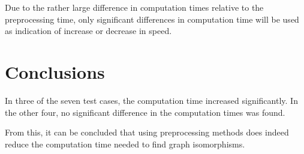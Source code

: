\documentclass[twoside]{article}
\theoremstyle{definition}
\theoremstyle{plain}
\begin{document}
\begin{multicols}{2}
Due to the rather large difference in computation times relative to the preprocessing time, only significant differences in computation time will be used as indication of increase or decrease in speed.

\section{Conclusions}

In three of the seven test cases, the computation time increased significantly. In the other four, no significant difference in the computation times was found.

From this, it can be concluded that using preprocessing methods does indeed reduce the computation time needed to find graph isomorphisms.


\printbibliography




\end{multicols}
\newpage
\end{document}
